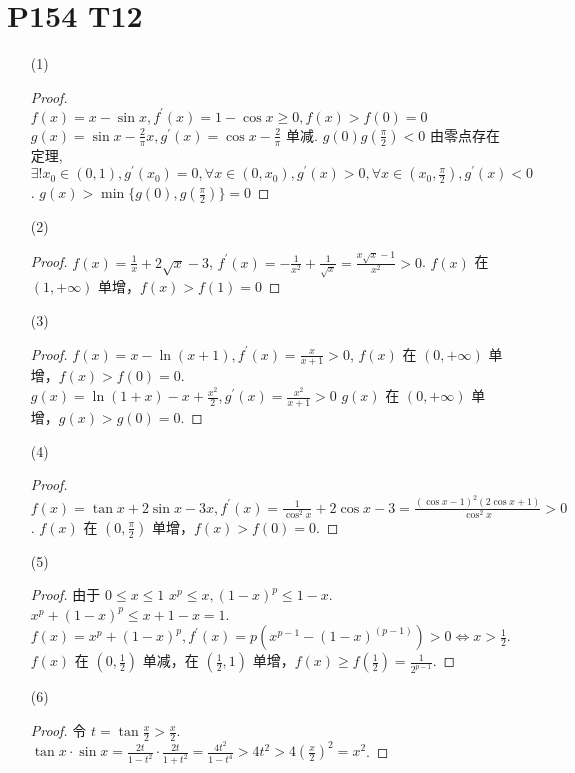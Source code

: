 \documentclass{article}
\newcommand{\ds}{^\prime}
\begin{document}
\section*{P154 T12}

\begin{itemize}
    \item [(1)]
    \begin{proof} \quad \\
        $f(x) = x - \sin x, f^\prime(x) = 1 - \cos x \geqslant 0, f(x) > f(0) = 0$ \\
        $g(x) = \sin x - \frac{2}{\pi}x, g^\prime(x) = \cos x - \frac{2}{\pi}$ 单减. $g(0)g(\frac{\pi}{2}) < 0$ 由零点存在定理, $\exists ! x_0 \in (0, 1), g^\prime(x_0) = 0, \forall x \in (0, x_0), g^\prime(x) > 0, \forall x \in \left(x_0, \frac{\pi}{2}\right), g^\prime(x) < 0$. $g(x) > \min\{g(0), g(\frac{\pi}{2})\} = 0$
    \end{proof}
    \item [(2)]
    \begin{proof}
        $f(x) = \frac{1}{x} + 2\sqrt{x} - 3$, $f\ds(x) = -\frac{1}{x^2} + \frac{1}{\sqrt{x}} = \frac{x\sqrt{x} - 1}{x^2} > 0$. $f(x)$ 在 $(1, + \infty)$ 单增，$f(x) > f(1) = 0$
    \end{proof}
    \item [(3)] 
    \begin{proof}
        $f(x) = x - \ln(x + 1), f\ds(x) = \frac{x}{x + 1} > 0$, $f(x)$ 在 $(0, + \infty)$ 单增，$f(x) > f(0) = 0$. \\
        $g(x) = \ln(1 + x) - x + \frac{x^2}{2}, g\ds(x) = \frac{x^2}{x + 1} > 0$ $g(x)$ 在 $(0, + \infty)$ 单增，$g(x) > g(0) = 0$.
    \end{proof}
    \item [(4)]
    \begin{proof}
        $f(x) = \tan x + 2\sin x - 3x, f\ds(x) = \frac{1}{\cos^2 x} + 2\cos x - 3 = \frac{(\cos x - 1)^2(2\cos x + 1)}{\cos^2 x} > 0$. $f(x)$ 在 $\left(0, \frac{\pi}{2}\right)$ 单增，$f(x) > f(0) = 0$.
    \end{proof}
    \item [(5)]
    \begin{proof}
        由于 $0 \leqslant x \leqslant  1$ $x^p \leqslant x, (1 - x)^p \leqslant 1 - x$. $x^p + (1 - x)^p \leqslant x + 1 - x = 1$. \\
        $f(x) = x^p + (1 - x)^p, f\ds(x) = p(x^{p - 1} - (1 - x)^(p - 1)) > 0 \Leftrightarrow x > \frac{1}{2}$. $f(x)$ 在 $\left(0, \frac{1}{2}\right)$ 单减，在 $\left(\frac{1}{2}, 1\right)$ 单增，$f(x) \geqslant f(\frac{1}{2}) = \frac{1}{2^{p - 1}}$.
    \end{proof}
    \item [(6)]
    \begin{proof}
        令 $t = \tan \frac{x}{2} > \frac{x}{2}$. \\
        $\tan x \cdot \sin x = \frac{2t}{1 - t^2}\cdot \frac{2t}{1 + t^2} = \frac{4t^2}{1 - t^4} > 4t^2 > 4\left(\frac{x}{2}\right)^2 = x^2$.
    \end{proof}
\end{itemize}
\end{document}
